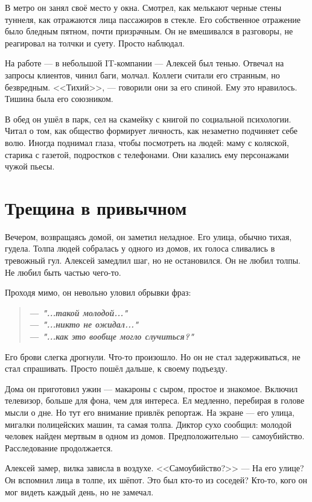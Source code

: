 \documentclass[12pt,a4paper]{book}
\newenvironment{dialogue}{\begin{quote}\itshape}{\end{quote}} %
\begin{document}
В метро он занял своё место у окна. Смотрел, как мелькают черные стены туннеля, как отражаются лица пассажиров в стекле. Его собственное отражение было бледным пятном, почти призрачным. Он не вмешивался в разговоры, не реагировал на толчки и суету. Просто наблюдал.

На работе --- в небольшой IT-компании --- Алексей был тенью. Отвечал на запросы клиентов, чинил баги, молчал. Коллеги считали его странным, но безвредным. <<Тихий>>, --- говорили они за его спиной. Ему это нравилось. Тишина была его союзником.

В обед он ушёл в парк, сел на скамейку с книгой по социальной психологии. Читал о том, как общество формирует личность, как незаметно подчиняет себе волю. Иногда поднимал глаза, чтобы посмотреть на людей: маму с коляской, старика с газетой, подростков с телефонами. Они казались ему персонажами чужой пьесы.

\section{Трещина в привычном}

Вечером, возвращаясь домой, он заметил неладное. Его улица, обычно тихая, гудела. Толпа людей собралась у одного из домов, их голоса сливались в тревожный гул. Алексей замедлил шаг, но не остановился. Он не любил толпы. Не любил быть частью чего-то.

Проходя мимо, он невольно уловил обрывки фраз:
\begin{dialogue}
\textbf{--- "...такой молодой..."}\\[0.5em]
\textbf{--- "...никто не ожидал..."}\\[0.5em]
\textbf{--- "...как это вообще могло случиться?"}
\end{dialogue}

Его брови слегка дрогнули. Что-то произошло. Но он не стал задерживаться, не стал спрашивать. Просто пошёл дальше, к своему подъезду.

Дома он приготовил ужин --- макароны с сыром, простое и знакомое. Включил телевизор, больше для фона, чем для интереса. Ел медленно, перебирая в голове мысли о дне. Но тут его внимание привлёк репортаж. На экране --- его улица, мигалки полицейских машин, та самая толпа. Диктор сухо сообщил: молодой человек найден мертвым в одном из домов. Предположительно --- самоубийство. Расследование продолжается.

Алексей замер, вилка зависла в воздухе. <<Самоубийство?>> --- На его улице? Он вспомнил лица в толпе, их шёпот. Это был кто-то из соседей? Кто-то, кого он мог видеть каждый день, но не замечал.
\end{document}
